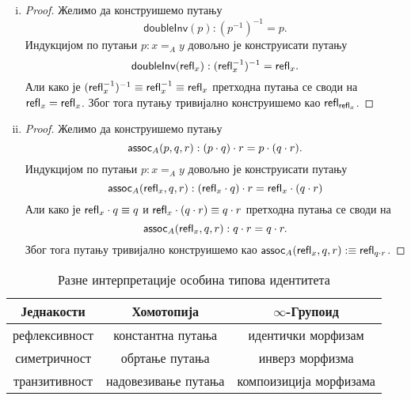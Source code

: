 \documentclass[12pt,oneside]{memoir}
\begin{document}
\begin{enumerate}[(i)]
\begin{proof}
        Али како је $\refl{x}^{-1} \equiv \refl{x}$ претходне путање се своде на оне као и у претходном доказу. Због тога обе путање тривијално конструишемо као $\refl{\refl{x}}$.
    \end{proof}
    \item
    \begin{proof}
        Желимо да конструишемо путању
        \[ \mathsf{doubleInv} (p) : (p^{-1})^{-1} = p. \]
        Индукцијом по путањи $p : x =_A y$ довољно је конструисати путању
        \[ \mathsf{doubleInv} (\mathsf{refl}_{x}) : (\mathsf{refl}_{x}^{-1})^{-1} = \mathsf{refl}_{x}. \]
        Али како је $(\mathsf{refl}_{x}^{-1})^{-1} \equiv \mathsf{refl}_{x}^{-1} \equiv \mathsf{refl}_{x}$ претходна путања се своди на $\mathsf{refl}_{x} = \mathsf{refl}_{x}$. Због тога путању тривијално конструишемо као $\refl{\refl{x}}$. 
    \end{proof} 
    \item
    \begin{proof}
        Желимо да конструишемо путању
        \[ \mathsf{assoc}_{A} (p, q, r) : (p \cdot q) \cdot r = p \cdot (q \cdot r). \]
        Индукцијом по путањи $p : x =_A y$ довољно је конструисати путању
        \[ \mathsf{assoc}_{A} (\mathsf{refl}_{x}, q, r) : (\mathsf{refl}_{x} \cdot q) \cdot r = \mathsf{refl}_{x} \cdot (q \cdot r) \]
        Али како је $\mathsf{refl}_{x} \cdot q \equiv q$ и $\mathsf{refl}_{x} \cdot (q \cdot r) \equiv q \cdot r$ претходна путања се своди на
        \[ \mathsf{assoc}_{A} (\mathsf{refl}_{x}, q, r) : q \cdot r = q \cdot r. \]
        Због тога путању тривијално конструишемо као $\mathsf{assoc}_{A} (\mathsf{refl}_{x}, q, r) :\equiv \mathsf{refl}_{q \cdot r}$.
    \end{proof}
\end{enumerate}

\begin{table}
    \begin{center}
        \begin{tabular}[c]{c c c}
            Једнакости & Хомотопија & $\infty$-Групоид \\
            \hline%
            рефлексивност & константна путања & идентички морфизам \\
            симетричност & обртање путања & инверз морфизма \\
            транзитивност & надовезивање путања & компоизиција морфизама\\
        \end{tabular}
    \end{center}
    \caption{Разне интерпретације особина типова идентитета}
    \label{table:inftygroupoid}
\end{table}
\end{document}
